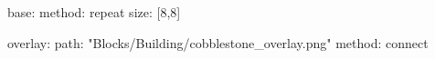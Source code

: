 base:
  method: repeat
  size: [8,8]

overlay:
  path: "Blocks/Building/cobblestone_overlay.png"
  method: connect